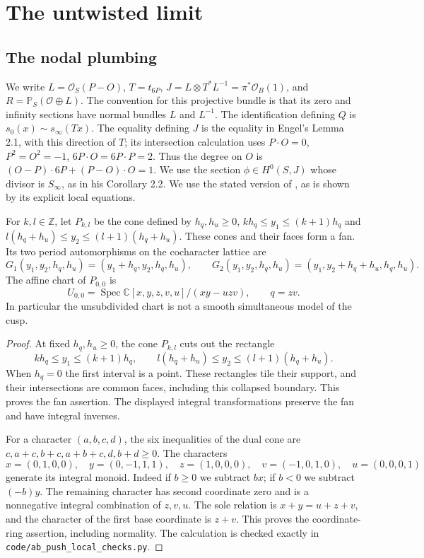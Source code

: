 \section{The untwisted limit}\label{push:section:A}
\subsection{The nodal plumbing}\label{push:section:A.1}

We write $L=\mathcal O_S(P-O)$, $T=t_{6P}$,
$J=L\otimes T^*L^{-1}=\pi^*\mathcal O_B(1)$, and
$R=\mathbb P_S(\mathcal O\oplus L)$. The convention for this projective
bundle is that its zero and infinity sections have normal bundles
$L$ and $L^{-1}$. The identification defining $Q$ is
$s_0(x)\sim s_\infty(Tx)$. The equality defining $J$ is the equality
in Engel's Lemma 2.1, with this direction of $T$; its intersection
calculation uses $P\cdot O=0$, $P^2=O^2=-1$,
$6P\cdot O=6P\cdot P=2$. Thus the degree on $O$ is
$(O-P)\cdot6P+(P-O)\cdot O=1$. We use the section
$\phi\in H^0(S,J)$ whose divisor is $S_\infty$, as in his
Corollary 2.2. We use the stated version of
\cite{Engel2026}, as is shown by its explicit local equations.

\begin{proposition}\label{push:src:A.1.1}\label{push:A11}
For $k,l\in\mathbb Z$, let $P_{k,l}$ be the cone defined by $h_q,h_u\geq0$, $kh_q\leq y_1\leq(k+1)h_q$ and $l(h_q+h_u)\leq y_2\leq(l+1)(h_q+h_u)$. These cones and their faces form a fan. Its two
period automorphisms on the cocharacter lattice are
\[
 G_1(y_1,y_2,h_q,h_u)=(y_1+h_q,y_2,h_q,h_u),\qquad
 G_2(y_1,y_2,h_q,h_u)=(y_1,y_2+h_q+h_u,h_q,h_u).
\]
The affine chart of $P_{0,0}$ is
\[
 U_{0,0}=\operatorname{Spec}\mathbb C[x,y,z,v,u]/(xy-uzv),
 \qquad q=zv.
\]
In particular the unsubdivided chart is not a smooth simultaneous
model of the cusp.
\end{proposition}

\begin{proof}
At fixed $h_q,h_u\geq0$, the cone $P_{k,l}$ cuts out the rectangle
\[
 kh_q\leq y_1\leq(k+1)h_q,\qquad
 l(h_q+h_u)\leq y_2\leq(l+1)(h_q+h_u).
\]
When $h_q=0$ the first interval is a point. These rectangles tile
their support, and their intersections are common faces, including
this collapsed boundary. This proves the fan assertion. The displayed
integral transformations preserve the fan and have integral inverses.

For a character $(a,b,c,d)$, the six inequalities of the dual cone
are $c,a+c,b+c,a+b+c,d,b+d\geq0$. The characters
\[
 x=(0,1,0,0),\quad y=(0,-1,1,1),\quad
 z=(1,0,0,0),\quad v=(-1,0,1,0),\quad u=(0,0,0,1)
\]
generate its integral monoid. Indeed if $b\geq0$ we subtract $b x$;
if $b<0$ we subtract $(-b)y$. The remaining character has second
coordinate zero and is a nonnegative integral combination of $z,v,u$.
The sole relation is $x+y=u+z+v$, and the character of the first
base coordinate is $z+v$. This proves the coordinate-ring assertion,
including normality. The calculation is checked exactly in
\texttt{code/ab\_push\_local\_checks.py}.
\end{proof}

